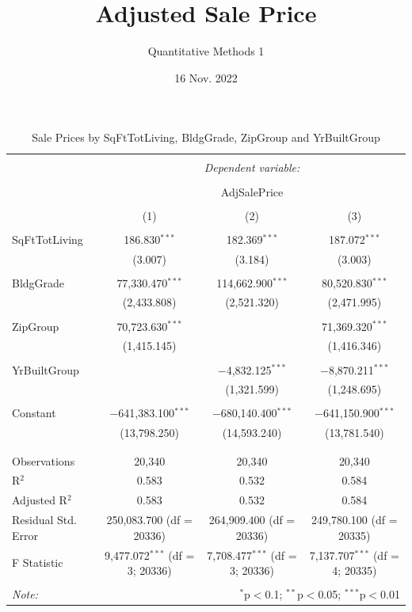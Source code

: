 \documentclass[12pt,a4paper,landscape]{article}
\title{Adjusted Sale Price}
\date{16 Nov. 2022}
\author{Quantitative Methods 1}
\begin{document}
	\maketitle

\begin{table}[H] \centering 
	\caption{Sale Prices by SqFtTotLiving, BldgGrade, ZipGroup and YrBuiltGroup} 
	\label{}
	\begin{tabular}{@{\extracolsep{5pt}}lccc} 
		\\[-1.8ex]\hline 
		\hline \\[-1.8ex] 
		& \multicolumn{3}{c}{\textit{Dependent variable:}} \\ 
		\cline{2-4} 
		\\[-1.8ex] & \multicolumn{3}{c}{AdjSalePrice} \\ 
		\\[-1.8ex] & (1) & (2) & (3)\\ 
		\hline \\[-1.8ex] 
		SqFtTotLiving & 186.830$^{***}$ & 182.369$^{***}$ & 187.072$^{***}$ \\ 
		& (3.007) & (3.184) & (3.003) \\ 
		& & & \\ 
		BldgGrade & 77,330.470$^{***}$ & 114,662.900$^{***}$ & 80,520.830$^{***}$ \\ 
		& (2,433.808) & (2,521.320) & (2,471.995) \\ 
		& & & \\ 
		ZipGroup & 70,723.630$^{***}$ &  & 71,369.320$^{***}$ \\ 
		& (1,415.145) &  & (1,416.346) \\ 
		& & & \\ 
		YrBuiltGroup &  & $-$4,832.125$^{***}$ & $-$8,870.211$^{***}$ \\ 
		&  & (1,321.599) & (1,248.695) \\ 
		& & & \\ 
		Constant & $-$641,383.100$^{***}$ & $-$680,140.400$^{***}$ & $-$641,150.900$^{***}$ \\ 
		& (13,798.250) & (14,593.240) & (13,781.540) \\ 
		& & & \\ 
		\hline \\[-1.8ex] 
		Observations & 20,340 & 20,340 & 20,340 \\ 
		R$^{2}$ & 0.583 & 0.532 & 0.584 \\ 
		Adjusted R$^{2}$ & 0.583 & 0.532 & 0.584 \\ 
		Residual Std. Error & 250,083.700 (df = 20336) & 264,909.400 (df = 20336) & 249,780.100 (df = 20335) \\ 
		F Statistic & 9,477.072$^{***}$ (df = 3; 20336) & 7,708.477$^{***}$ (df = 3; 20336) & 7,137.707$^{***}$ (df = 4; 20335) \\ 
		\hline 
		\hline \\[-1.8ex] 
		\textit{Note:}  & \multicolumn{3}{r}{$^{*}$p$<$0.1; $^{**}$p$<$0.05; $^{***}$p$<$0.01} \\ 
	\end{tabular} 
\end{table} 
\end{document}
